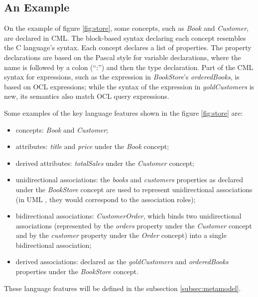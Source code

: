 \subsection{An Example}\label{subsec:example}

On the example of figure \ref{fig:store}, some concepts, such as \emph{Book} and \emph{Customer}, are declared in CML. 
The block-based syntax declaring each concept resembles the C \cite{clang} language's syntax. 
Each concept declares a list of properties.
The property declarations are based on the Pascal \cite{pascal} style for variable declarations,
where the name is followed by a colon (``:'') and then the type declaration.
Part of the CML syntax for expressions, such as the expression in \emph{BookStore}'s \emph{orderedBooks}, is based on OCL \cite{ocl} expressions; while the syntax of the expression in \emph{goldCustomers} is new, its semantics also match OCL \cite{ocl} query expressions.



Some examples of the key language features shown in the figure \ref{fig:store} are:
\begin{itemize}
\item concepts: \emph{Book} and \emph{Customer};
\item attributes: \emph{title} and \emph{price} under the \emph{Book} concept;  
\item derived attributes: \emph{totalSales} under the \emph{Customer} concept;
\item unidirectional associations: the \emph{books} and \emph{customers} properties as declared under the \emph{BookStore} concept are used to represent unidirectional associations (in UML \cite{uml}, they would correspond to the association roles);
\item bidirectional associations: \emph{CustomerOrder},
which binds two unidirectional associations (represented by the \emph{orders} property under the \emph{Customer} concept and by the \emph{customer} property under the \emph{Order} concept) into a single bidirectional association;
\item derived associations: declared as the \emph{goldCustomers} and \emph{orderedBooks} properties under the \emph{BookStore} concept.
\end{itemize}

These language features will be defined in the subsection \ref{subsec:metamodel}.